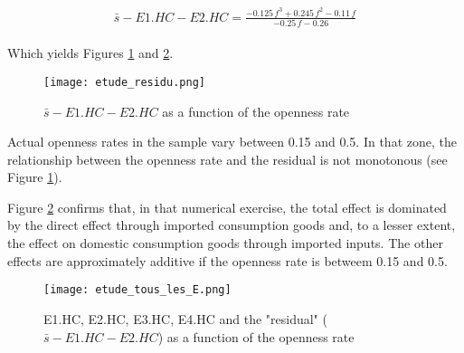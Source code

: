 \documentclass[11pt,a4paper]{article}
\begin{document}
\begin{appendices}
\begin{gather*}
\begin{array}{r}
\bar{s}-E1.HC-E2.HC = \frac{-0.125 \, f^{3} + 0.245 \, f^{2} - 0.11 \, f}{-0.25 \, f - 0.26
}
\end{array}
\end{gather*}

Which yields Figures \ref{fig:resid} and \ref{fig:tous_les_E}.
\begin{figure}[!h]
	\begin{center}
		\texttt{[image: etude\_residu.png]}
		\caption{$\bar{s}-E1.HC-E2.HC$ as a function of the openness rate}
		\label{fig:resid}
	\end{center}
\end{figure}

Actual openness rates in the sample vary between 0.15 and 0.5. In that zone, the relationship between the openness rate and the residual is not monotonous (see Figure \ref{fig:resid}).

Figure \ref{fig:tous_les_E} confirms that, in that numerical exercise, the total effect is dominated by the direct effect through imported consumption goods and, to a lesser extent, the effect on domestic consumption goods through imported inputs. 
The other effects are approximately additive if the openness rate is betweem 0.15 and 0.5.

\begin{figure}[!h]
	\begin{center}
		\texttt{[image: etude\_tous\_les\_E.png]}
		\caption{E1.HC, E2.HC, E3.HC, E4.HC and the "residual"  ($\bar{s}-E1.HC-E2.HC$) as a function of the openness rate}
		\label{fig:tous_les_E}
	\end{center}
\end{figure}

\end{appendices}
\end{document}
